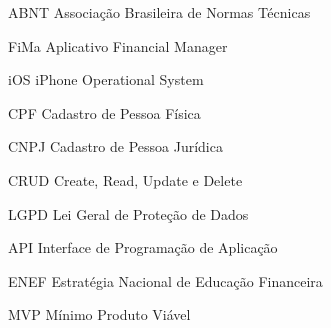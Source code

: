 \documentclass[
	12pt,					%
	openright,				%
	oneside,					%
	a4paper,					%
	english,					%
	portuguese					%
	]{abntex2}
\begin{document}
\frenchspacing


\pretextual





\setcounter{page}{1}









%







\listoffigures*                 
\cleardoublepage

\listoftables*
\cleardoublepage

\begin{siglas}
  \item [ABNT] Associação Brasileira de Normas Técnicas
  \item [FiMa] Aplicativo Financial Manager
  \item [iOS] iPhone Operational System
  \item [CPF] Cadastro de Pessoa Física
  \item [CNPJ] Cadastro de Pessoa Jurídica
  \item [CRUD] Create, Read, Update e Delete
  \item [LGPD] Lei Geral de Proteção de Dados
  \item [API] Interface de Programação de Aplicação
  \item [ENEF] Estratégia Nacional de Educação Financeira
  \item [MVP] Mínimo Produto Viável
\end{siglas}
\end{document}
